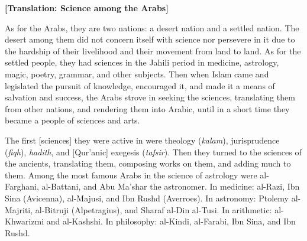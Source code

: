 \documentclass[11pt,a4paper]{article}
\begin{document}
{\arabicfont{}}

\bigskip

\noindent\textbf{[Translation: Science among the Arabs]}

As for the Arabs, they are two nations: a desert nation and a settled nation. The desert among them did not concern itself with science nor persevere in it due to the hardship of their livelihood and their movement from land to land. As for the settled people, they had sciences in the Jahili period in medicine, astrology, magic, poetry, grammar, and other subjects. Then when Islam came and legislated the pursuit of knowledge, encouraged it, and made it a means of salvation and success, the Arabs strove in seeking the sciences, translating them from other nations, and rendering them into Arabic, until in a short time they became a people of sciences and arts.

The first [sciences] they were active in were theology (\textit{kalam}), jurisprudence (\textit{fiqh}), \textit{hadith}, and [Qur'anic] exegesis (\textit{tafsir}). Then they turned to the sciences of the ancients, translating them, composing works on them, and adding much to them. Among the most famous Arabs in the science of astrology were al-Farghani, al-Battani, and Abu Ma'shar the astronomer. In medicine: al-Razi, Ibn Sina (Avicenna), al-Majusi, and Ibn Rushd (Averroes). In astronomy: Ptolemy al-Majriti, al-Bitruji (Alpetragius), and Sharaf al-Din al-Tusi. In arithmetic: al-Khwarizmi and al-Kashshi. In philosophy: al-Kindi, al-Farabi, Ibn Sina, and Ibn Rushd.
\end{document}
